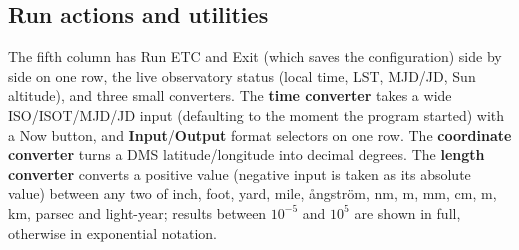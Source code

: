 \subsection{Run actions and utilities}

The fifth column has \textsf{Run ETC} and \textsf{Exit} (which saves the
configuration) side by side on one row, the live observatory status
(local time, LST, MJD/JD, Sun altitude), and three small converters. The
\textbf{time converter} takes a wide ISO/ISOT/MJD/JD input (defaulting to
the moment the program started) with a \textsf{Now} button, and
\textbf{Input}/\textbf{Output} format selectors on one row. The
\textbf{coordinate converter} turns a DMS latitude/longitude into decimal
degrees. The \textbf{length converter} converts a positive value (negative
input is taken as its absolute value) between any two of inch, foot, yard,
mile, \aa ngstr\"om, nm, \textmu m, mm, cm, m, km, parsec and light-year;
results between $10^{-5}$ and $10^{5}$ are shown in full, otherwise in
exponential notation.
